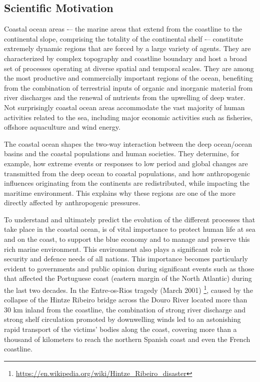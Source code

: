 \subsection{Scientific Motivation}

Coastal ocean areas -– the marine areas that extend from the coastline
to the continental slope, comprising the totality of the continental
shelf -– constitute extremely dynamic regions that are forced by a
large variety of agents. They are characterized by complex topography
and coastline boundary and host a broad set of processes operating at
diverse spatial and temporal scales. They are among the most
productive and commercially important regions of the ocean, benefiting
from the combination of terrestrial inputs of organic and inorganic
material from river discharges and the renewal of nutrients from the
upwelling of deep water. Not surprisingly coastal ocean areas
accommodate the vast majority of human activities related to the sea,
including major economic activities such as fisheries, offshore
aquaculture and wind energy.
 
The coastal ocean shapes the two-way interaction between the deep
ocean/ocean basins and the coastal populations and human
societies. They determine, for example, how extreme events or
responses to low period and global changes are transmitted from the
deep ocean to coastal populations, and how anthropogenic influences
originating from the continents are redistributed, while impacting the
maritime environment. This explains why these regions are one of the
more directly affected by anthropogenic pressures.
 
To understand and ultimately predict the evolution of the different
processes that take place in the coastal ocean, is of vital importance
to protect human life at sea and on the coast, to support the blue
economy and to manage and preserve this rich marine environment. This
environment also plays a significant role in security and defence
needs of all nations. This importance becomes particularly evident to
governments and public opinion during significant events such as those
that affected the Portuguese coast (eastern margin of the North
Atlantic) during the last two decades. In the Entre-os-Rios tragedy
(March 2001)
\footnote{\url{https://en.wikipedia.org/wiki/Hintze_Ribeiro_disaster}},
caused by the collapse of the Hintze Ribeiro bridge across the Douro
River located more than 30 km inland from the coastline, the
combination of strong river discharge and strong shelf circulation
promoted by downwelling winds led to an astonishing rapid transport of
the victims' bodies along the coast, covering more than a thousand of
kilometers to reach the northern Spanish coast and even the French
coastline. 

